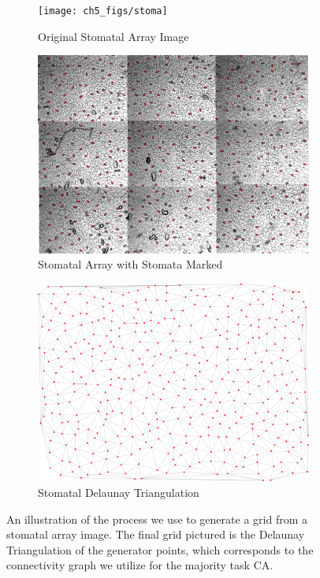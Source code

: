 \documentclass[a4paper,11pt]{article}
\begin{document}
\begin{figure}[htp]
\centering
  \begin{subfigure}[t]{0.6\textwidth}
  \texttt{[image: ch5\_figs/stoma]}
  \caption{Original Stomatal Array Image}
  \end{subfigure}
  
  \begin{subfigure}[t]{0.6\textwidth}
  \centering
  \includegraphics[width=\textwidth]{ch5_figs/stoma-colored}
  \caption{Stomatal Array with Stomata Marked}
  \end{subfigure}
  
  \begin{subfigure}[t]{0.6\textwidth}
  \centering
  \includegraphics[width=\textwidth]{ch5_figs/stoma_red_edited}
  \caption{Stomatal Delaunay Triangulation}
  \end{subfigure}
\caption[Grid Generation from Stomatal Array]{
  An illustration of the process we use to generate a grid from a stomatal array image. The final grid pictured is the Delaunay Triangulation of the generator points, which corresponds to the connectivity graph we utilize for the majority task CA.
  }
\label{fig:stoma_graph_gen}
\end{figure}
\end{document}
